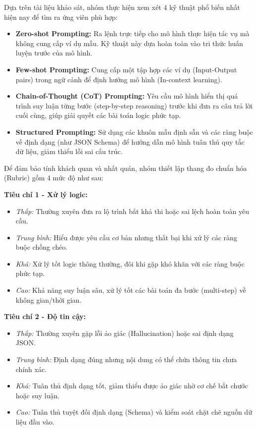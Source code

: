 
Dựa trên tài liệu khảo sát, nhóm thực hiện xem xét 4 kỹ thuật phổ biến nhất hiện nay để tìm ra ứng viên phù hợp:

\begin{itemize}
    \item \textbf{Zero-shot Prompting:} Ra lệnh trực tiếp cho mô hình thực hiện tác vụ mà không cung cấp ví dụ mẫu. Kỹ thuật này dựa hoàn toàn vào tri thức huấn luyện trước của mô hình.
    
    \item \textbf{Few-shot Prompting:} Cung cấp một tập hợp các ví dụ (Input-Output pairs) trong ngữ cảnh để định hướng mô hình (In-context learning).
    
    \item \textbf{Chain-of-Thought (CoT) Prompting:} Yêu cầu mô hình hiển thị quá trình suy luận từng bước (step-by-step reasoning) trước khi đưa ra câu trả lời cuối cùng, giúp giải quyết các bài toán logic phức tạp.
    
    \item \textbf{Structured Prompting:} Sử dụng các khuôn mẫu định sẵn và các ràng buộc về định dạng (như JSON Schema) để hướng dẫn mô hình tuân thủ quy tắc dữ liệu, giảm thiểu lỗi sai cấu trúc.
\end{itemize}


Để đảm bảo tính khách quan và nhất quán, nhóm thiết lập thang đo chuẩn hóa (Rubric) gồm 4 mức độ như sau:

\textbf{Tiêu chí 1 - Xử lý logic:}
\begin{itemize}
    \item \textit{Thấp:} Thường xuyên đưa ra lộ trình bất khả thi hoặc sai lệch hoàn toàn yêu cầu.
    \item \textit{Trung bình:} Hiểu được yêu cầu cơ bản nhưng thất bại khi xử lý các ràng buộc chồng chéo.
    \item \textit{Khá:} Xử lý tốt logic thông thường, đôi khi gặp khó khăn với các ràng buộc phức tạp.
    \item \textit{Cao:} Khả năng suy luận sâu, xử lý tốt các bài toán đa bước (multi-step) về không gian/thời gian.
\end{itemize}

\textbf{Tiêu chí 2 - Độ tin cậy:}
\begin{itemize}
    \item \textit{Thấp:} Thường xuyên gặp lỗi ảo giác (Hallucination) hoặc sai định dạng JSON.
    \item \textit{Trung bình:} Định dạng đúng nhưng nội dung có thể chứa thông tin chưa chính xác.
    \item \textit{Khá:} Tuân thủ định dạng tốt, giảm thiểu được ảo giác nhờ cơ chế bắt chước hoặc suy luận.
    \item \textit{Cao:} Tuân thủ tuyệt đối định dạng (Schema) và kiểm soát chặt chẽ nguồn dữ liệu đầu vào.
\end{itemize}

